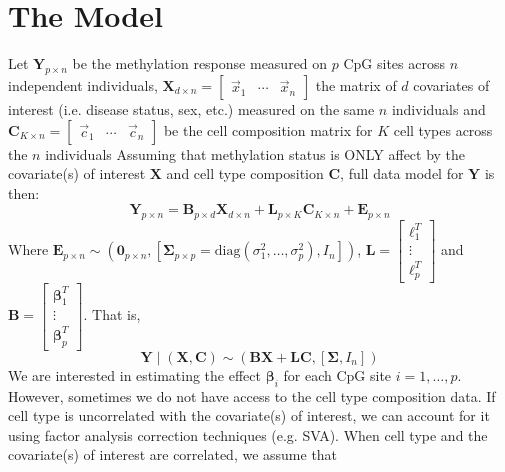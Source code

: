 \documentclass{article}
\begin{document}
\section{The Model}
Let $\bm{Y}_{p \times n}$ be the methylation response measured on $p$ CpG sites across $n$ independent individuals, $\bm{X}_{d \times n} = \left[ \begin{matrix}
\vec{x}_1 & \cdots & \vec{x}_n
\end{matrix} \right]$ the matrix of $d$ covariates of interest (i.e. disease status, sex, etc.) measured on the same $n$ individuals and $\bm{C}_{K \times n} = \left[ \begin{matrix}
\vec{c}_1 & \cdots & \vec{c}_n
\end{matrix} \right]$ be the cell composition matrix for $K$ cell types across the $n$ individuals  Assuming that methylation status is ONLY affect by the covariate(s) of interest $\bm{X}$ and cell type composition $\bm{C}$, full data model for $\bm{Y}$ is then:
\begin{equation}
\bm{Y}_{p \times n} = \bm{B}_{p \times d}\bm{X}_{d \times n} + \bm{L}_{p \times K}\bm{C}_{K \times n} + \bm{E}_{p \times n}
\end{equation}
Where $\bm{E}_{p \times n} \sim \left( \bm{0}_{p\times n}, \left[\bm{\Sigma}_{p \times p} = \text{diag}\left( \sigma_1^2, \ldots, \sigma_p^2 \right), I_{n}\right] \right)$, $\bm{L} = \left[ \begin{matrix}
\bm{\ell}_1^T\\
\vdots\\
\bm{\ell}_p^T
\end{matrix} \right]$ and $\bm{B} = \left[ \begin{matrix}
\bm{\beta}_1^T\\
\vdots\\
\bm{\beta}_p^T
\end{matrix} \right]$. That is,
\begin{equation}
\bm{Y} \mid \left( \bm{X}, \bm{C} \right) \sim \left( \bm{B}\bm{X} + \bm{L}\bm{C}, \left[\bm{\Sigma}, I_n\right] \right)
\end{equation}
We are interested in estimating the effect $\bm{\beta}_i$ for each CpG site $i = 1, \ldots, p$.\\
\indent However, sometimes we do not have access to the cell type composition data. If cell type is uncorrelated with the covariate(s) of interest, we can account for it using factor analysis correction techniques (e.g. SVA). When cell type and the covariate(s) of interest are correlated, we assume that
\end{document}
